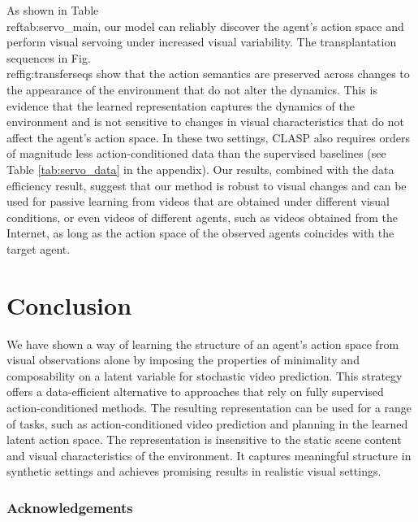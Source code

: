 \documentclass{article} %
\begin{document}
As shown in Table\\ref{tab:servo_main}, our model can reliably discover the agent's action space and perform visual servoing under increased visual variability. The transplantation sequences in Fig.\\ref{fig:transferseqs} show that the action semantics are preserved across changes to the appearance of the environment that do not alter the dynamics. This is evidence that the learned representation captures the dynamics of the environment and is not sensitive to changes in visual characteristics that do not affect the agent's action space. In these two settings, CLASP also requires orders of magnitude less action-conditioned data than the supervised baselines (see Table \ref{tab:servo_data} in the appendix). Our results, combined with the data efficiency result, suggest that our method is robust to visual changes and can be used for passive learning from videos that are obtained under different visual conditions, or even videos of different agents, such as videos obtained from the Internet, as long as the action space of the observed agents coincides with the target agent. 



 
\section{Conclusion}

We have shown a way of learning the structure of an agent's action space from visual observations alone by imposing the properties of minimality and composability on a latent variable for stochastic video prediction. 
This strategy offers a data-efficient alternative to approaches that rely on fully supervised action-conditioned methods. The resulting representation can be used for a range of tasks, such as action-conditioned video prediction and planning in the learned latent action space. The representation is insensitive to the static scene content and visual characteristics of the environment.
It captures meaningful structure in synthetic settings and achieves promising results in realistic visual settings. %

\subsubsection*{Acknowledgements}
\end{document}
